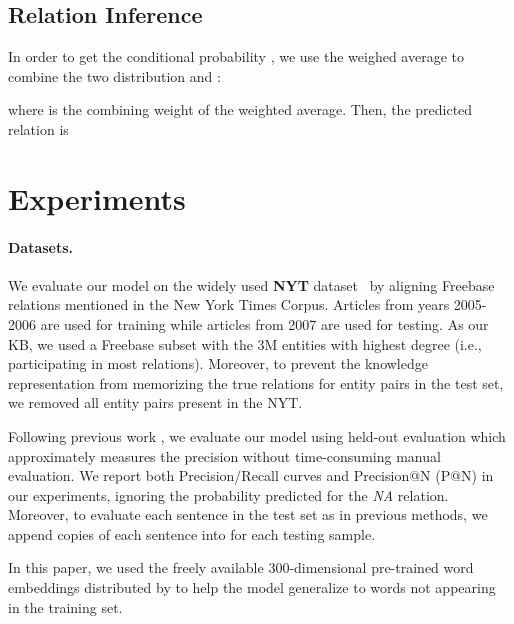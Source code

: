 \documentclass[11pt,a4paper]{article}
\begin{document}
\subsection{Relation Inference}
In order to get the conditional probability , we use the weighed average to combine the two distribution  and :


\noindent where  is the combining weight of the weighted average. Then, the predicted relation  is

 
\section{Experiments}




\paragraph*{Datasets.}

We evaluate our model on the widely used {\bf NYT} dataset~\cite{riede2010modeling} by aligning Freebase relations mentioned in the New York Times Corpus.
Articles from years 2005-2006 are used for training while articles from 2007 are used for testing.
As our KB, we used a Freebase subset with the 3M entities with highest degree (i.e., participating in most relations).
Moreover, to prevent the knowledge representation from memorizing the true relations for entity pairs in the test set, we removed all entity pairs present in the NYT.








Following previous work \cite{mintz2009distant}, we evaluate our model using held-out evaluation which approximately measures the precision without time-consuming manual evaluation. 
We report both Precision/Recall curves and Precision@N (P@N) in our experiments, ignoring the probability predicted for the {\em NA} relation.
Moreover, to evaluate each sentence in the test set as in previous methods, we append  copies of each sentence into  for each testing sample.

In this paper, we used the freely available 300-dimensional pre-trained word embeddings distributed by  to help the model generalize to words not appearing in the training set.
\end{document}
